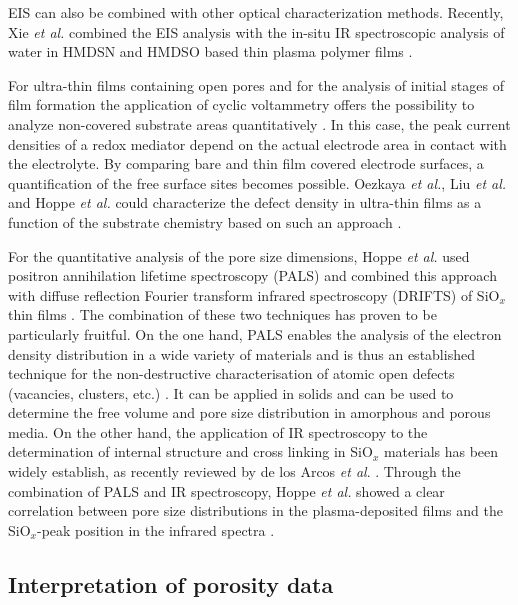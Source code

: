 \documentclass[AMA,STIX2COL]{WileyNJD-v2} %
\begin{document}
EIS can also be combined with other optical characterization methods. Recently, Xie \textit{et al.} combined the EIS analysis with the in-situ IR spectroscopic analysis of water in HMDSN and HMDSO based thin plasma polymer films \cite{Xie.2022}.

For ultra-thin films containing open pores and for the analysis of initial stages of film formation the application of cyclic voltammetry offers the possibility to analyze non-covered substrate areas quantitatively \cite{Liu_2003,Ohto_2015,Hoppe.2017}. In this case, the peak current densities of a redox mediator depend on the actual electrode area in contact with the electrolyte. By comparing bare and thin film covered electrode surfaces, a quantification of the free surface sites becomes possible. Oezkaya \textit{et al.}, Liu \textit{et al.} and Hoppe \textit{et al.} could characterize the defect density in ultra-thin films as a function of the substrate chemistry based on such an approach \cite{Liu_2003,Ohto_2015,Hoppe.2017}.

For the quantitative analysis of the pore size dimensions, Hoppe \textit{et al.} used positron annihilation lifetime spectroscopy (PALS) and combined this approach with diffuse reflection Fourier transform infrared spectroscopy (DRIFTS) of SiO$_x$ thin films \cite{Hoppe.2020}. The combination of these two techniques has proven to be particularly fruitful. On the one hand, PALS enables the analysis of the electron density distribution in a wide variety of materials and is thus an established technique for the non-destructive characterisation of atomic open defects (vacancies, clusters, etc.) \cite{Hoppe.2022}. It can be applied in solids and can be used to determine the free volume and pore size distribution in amorphous and porous media. On the other hand, the application of IR spectroscopy to the determination of internal structure and cross linking in SiO$_x$ materials has been widely establish, as recently reviewed by de los Arcos \textit{et al}. \cite{delosArcos.2021}. Through the combination of PALS and IR spectroscopy, Hoppe \textit{et al.} showed a clear correlation between pore size distributions in the plasma-deposited films and the SiO$_x$-peak position in the infrared spectra \cite{Hoppe.2020,Hoppe.2022}.


\subsection{Interpretation of porosity data}\label{subsec32}
\end{document}
